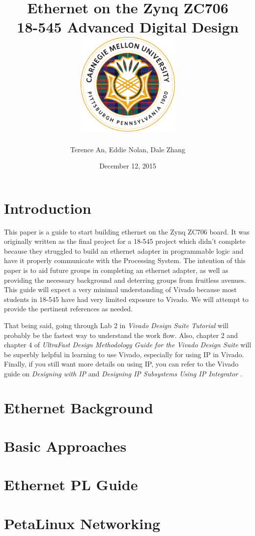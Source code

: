 \documentclass[12pt]{report}
\title{
  {Ethernet on the Zynq ZC706 \vspace{0.2in}}\\
  {\large 18-545 Advanced Digital Design \vspace{0.2in}}\\
  {\includegraphics[width=2in]{cmu_seal.png}}
}
\author{Terence An, Eddie Nolan, Dale Zhang}
\date{December 12, 2015}
\begin{document}
\maketitle

\chapter{Introduction}
This paper is a guide to start building ethernet on the Zynq ZC706 board. It was originally written as the final project for a 18-545 project which didn't complete because they struggled to build an ethernet adapter in programmable logic and have it properly communicate with the Processing System. The intention of this paper is to aid future groups in completing an ethernet adapter, as well as providing the necessary background and deterring groups from fruitless avenues. This guide will expect a very minimal understanding of Vivado because most students in 18-545 have had very limited exposure to Vivado. We will attempt to provide the pertinent references as needed.

That being said, going through Lab 2 in \textit{Vivado Design Suite Tutorial} \cite{vivado_tut} will probably be the fastest way to understand the work flow. Also, chapter 2 and chapter 4 of \textit{UltraFast Design Methodology Guide for the Vivado Design Suite} \cite{ultrafast} will be superbly helpful in learning to use Vivado, especially for using IP in Vivado. Finally, if you still want more details on using IP, you can refer to the Vivado guide on \textit{Designing with IP} \cite{IP} and \textit{Designing IP Subsystems Using IP Integrator} \cite{IP_subsystems}.


\chapter{Ethernet Background}

\chapter{Basic Approaches}

\chapter{Ethernet PL Guide}

\chapter{PetaLinux Networking}
\end{document}
